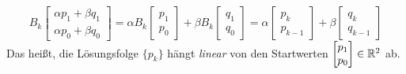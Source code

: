 \[
B_k \begin{bmatrix}
\alpha p_1 + \beta q_1 \\
\alpha p_0 + \beta q_0
\end{bmatrix} = \alpha B_k \begin{bmatrix}
p_1 \\
p_0
\end{bmatrix} + \beta B_k \begin{bmatrix}
q_1 \\
q_0
\end{bmatrix}= \alpha \begin{bmatrix}
p_k \\
p_{k-1}
\end{bmatrix} + \beta \begin{bmatrix}
q_k \\
q_{k-1}
\end{bmatrix}
\]
Das heißt, die Lösungsfolge $\{p_k\}$ hängt \emph{linear} von den Startwerten
$\begin{bmatrix}
p_1 \\
p_0
\end{bmatrix} \in \mathbb{R}^2$ ab.


